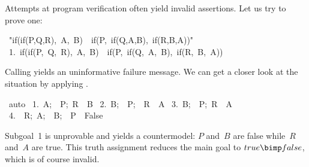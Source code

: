 Attempts at program verification often yield invalid assertions.
Let us try to prove one:
\begin{isabelle}
\ "if(if(P,Q,R),\ A,\ B)\ <->\ if(P,\ if(Q,A,B),\ if(R,B,A))"\isanewline
\ 1.\ if(if(P,\ Q,\ R),\ A,\ B)\ \isasymlongleftrightarrow \ if(P,\ if(Q,\ A,\ B),\ if(R,\ B,\
A))
\end{isabelle}
Calling  yields an uninformative failure message. We can
get a closer look at the situation by applying \methdx{auto}.
\begin{isabelle}
\ auto\isanewline
\ 1.\ \isasymlbrakk A;\ \isasymnot \ P;\ R\isasymrbrakk \ \isasymLongrightarrow \ B\isanewline
\ 2.\ \isasymlbrakk B;\ \isasymnot \ P;\ \isasymnot \ R\isasymrbrakk \ \isasymLongrightarrow \ A\isanewline
\ 3.\ \isasymlbrakk B;\ \isasymnot \ P;\ R\isasymrbrakk \ \isasymLongrightarrow \ A\isanewline
\ 4.\ \isasymlbrakk \isasymnot \ R;\ A;\ \isasymnot \ B;\ \isasymnot \ P\isasymrbrakk \ \isasymLongrightarrow \
False
\end{isabelle}
Subgoal~1 is unprovable and yields a countermodel: $P$ and~$B$ are false
while~$R$ and~$A$ are true.  This truth assignment reduces the main goal to
$true\bimp false$, which is of course invalid.

